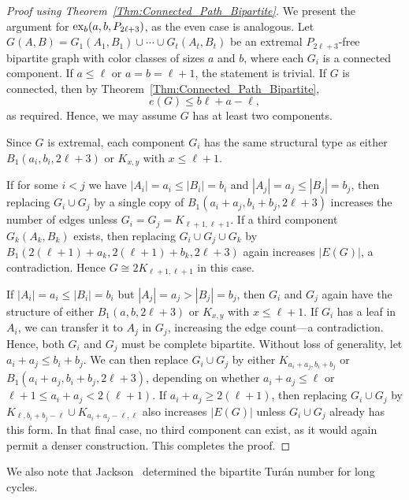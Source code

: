 \documentclass[11pt,a4paper]{article}
\newcommand{\ex}{{\rm ex}}
\begin{document}
\begin{proof}[Proof using Theorem~\ref{Thm:Connected_Path_Bipartite}]
We present the argument for $\ex_b(a,b, P_{2\ell+3})$, as the even case is analogous.  
Let $G(A,B) = G_1(A_1,B_1) \cup \cdots \cup G_t(A_t,B_t)$ be an extremal $P_{2\ell+3}$-free bipartite graph with color classes of sizes $a$ and $b$, where each $G_i$ is a connected component.  
If $a \le \ell$ or $a = b = \ell + 1$, the statement is trivial.  
If $G$ is connected, then by Theorem~\ref{Thm:Connected_Path_Bipartite},
\[
e(G) \le b\ell + a - \ell,
\]
as required.  
Hence, we may assume $G$ has at least two components.

Since $G$ is extremal, each component $G_i$ has the same structural type as either $B_1(a_i, b_i, 2\ell + 3)$ or $K_{x,y}$ with $x \le \ell + 1$.  

If for some $i<j$ we have  $|A_i| = a_i \le |B_i| = b_i$ and $|A_j| = a_j \le |B_j| = b_j$, then replacing $G_i \cup G_j$ by a single copy of $B_1(a_i + a_j, b_i + b_j, 2\ell + 3)$ increases the number of edges unless $G_i = G_j = K_{\ell + 1, \ell + 1}$.  
If a third component $G_k(A_k,B_k)$ exists, then replacing $G_i \cup G_j \cup G_k$ by $B_1(2(\ell + 1) + a_k, 2(\ell + 1) + b_k, 2\ell + 3)$ again increases $|E(G)|$, a contradiction.  
Hence $G \cong 2K_{\ell + 1, \ell + 1}$ in this case.

If $|A_i| = a_i \le |B_i| = b_i$ but $|A_j| = a_j > |B_j| = b_j$, then $G_i$ and $G_j$ again have the structure of either $B_1(a,b,2\ell+3)$ or $K_{x,y}$ with $x \le \ell + 1$.  
If $G_i$ has a leaf in $A_i$, we can transfer it to $A_j$ in $G_j$, increasing the edge count—a contradiction.  
Hence, both $G_i$ and $G_j$ must be complete bipartite.  
Without loss of generality, let $a_i + a_j \le b_i + b_j$.  
We can then replace $G_i \cup G_j$ by either $K_{a_i + a_j, b_i + b_j}$ or $B_1(a_i + a_j, b_i + b_j, 2\ell + 3)$, depending on whether $a_i + a_j \le \ell$ or $\ell + 1 \le a_i + a_j < 2(\ell + 1)$.  
If $a_i + a_j \ge 2(\ell + 1)$, then replacing $G_i \cup G_j$ by 
$K_{\ell, b_i + b_j - \ell} \cup K_{a_i + a_j - \ell, \ell}$ also increases $|E(G)|$ unless 
$G_i \cup G_j$ already has this form.  
In that final case, no third component can exist, as it would again permit a denser construction.  
This completes the proof.
\end{proof}

\medskip

We also note that Jackson~\cite{jackson1985long} determined the bipartite Turán number for long cycles.
\end{document}
